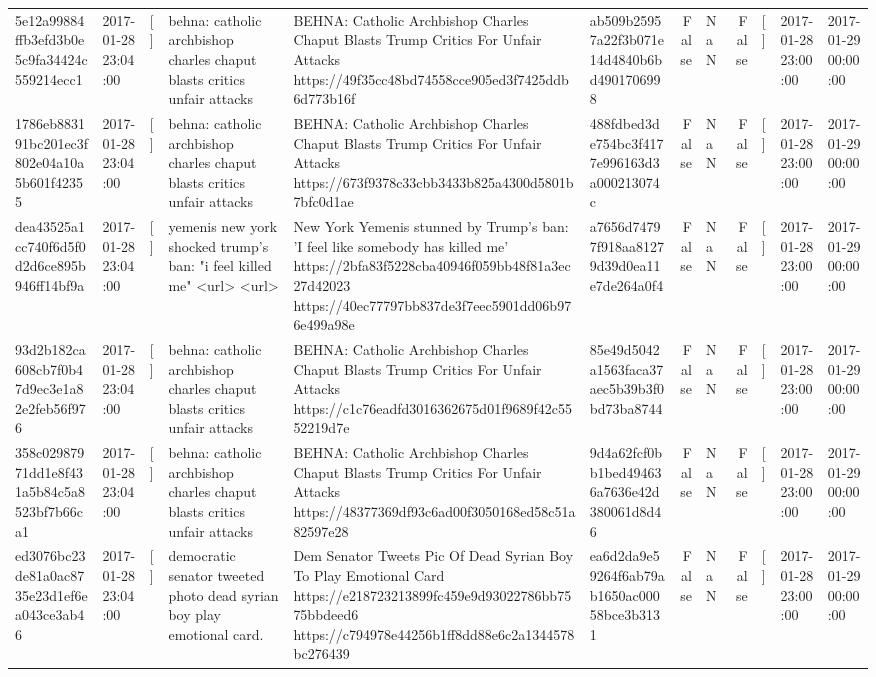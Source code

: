 \begin{tabular}{llllllrlrlll}
5e12a99884ffb3efd3b0e5c9fa34424c559214ecc1 & 2017-01-28 23:04:00 & [] & behna: catholic archbishop charles chaput blasts critics unfair attacks & BEHNA: Catholic Archbishop Charles Chaput Blasts Trump Critics For Unfair Attacks https://49f35cc48bd74558cce905ed3f7425ddb6d773b16f & ab509b25957a22f3b071e14d4840b6bd4901706998 & False & NaN & False & [] & 2017-01-28 23:00:00 & 2017-01-29 00:00:00 \\
1786eb883191bc201ec3f802e04a10a5b601f42355 & 2017-01-28 23:04:00 & [] & behna: catholic archbishop charles chaput blasts critics unfair attacks & BEHNA: Catholic Archbishop Charles Chaput Blasts Trump Critics For Unfair Attacks https://673f9378c33cbb3433b825a4300d5801b7bfc0d1ae & 488fdbed3de754bc3f4177e996163d3a000213074c & False & NaN & False & [] & 2017-01-28 23:00:00 & 2017-01-29 00:00:00 \\
dea43525a1cc740f6d5f0d2d6ce895b946ff14bf9a & 2017-01-28 23:04:00 & [] & yemenis new york shocked trump's ban: "i feel killed me" <url> <url> & New York Yemenis stunned by Trump's ban: 'I feel like somebody has killed me' https://2bfa83f5228cba40946f059bb48f81a3ec27d42023 https://40ec77797bb837de3f7eec5901dd06b976e499a98e & a7656d74797f918aa81279d39d0ea11e7de264a0f4 & False & NaN & False & [] & 2017-01-28 23:00:00 & 2017-01-29 00:00:00 \\
93d2b182ca608cb7f0b47d9ec3e1a82e2feb56f976 & 2017-01-28 23:04:00 & [] & behna: catholic archbishop charles chaput blasts critics unfair attacks & BEHNA: Catholic Archbishop Charles Chaput Blasts Trump Critics For Unfair Attacks https://c1c76eadfd3016362675d01f9689f42c5552219d7e & 85e49d5042a1563faca37aec5b39b3f0bd73ba8744 & False & NaN & False & [] & 2017-01-28 23:00:00 & 2017-01-29 00:00:00 \\
358c02987971dd1e8f431a5b84c5a8523bf7b66ca1 & 2017-01-28 23:04:00 & [] & behna: catholic archbishop charles chaput blasts critics unfair attacks & BEHNA: Catholic Archbishop Charles Chaput Blasts Trump Critics For Unfair Attacks https://48377369df93c6ad00f3050168ed58c51a82597e28 & 9d4a62fcf0bb1bed494636a7636e42d380061d8d46 & False & NaN & False & [] & 2017-01-28 23:00:00 & 2017-01-29 00:00:00 \\
ed3076bc23de81a0ac8735e23d1ef6ea043ce3ab46 & 2017-01-28 23:04:00 & [] & democratic senator tweeted photo dead syrian boy play emotional card. & Dem Senator Tweets Pic Of Dead Syrian Boy To Play Emotional Card https://e218723213899fc459e9d93022786bb7575bbdeed6 https://c794978e44256b1ff8dd88e6c2a1344578bc276439 & ea6d2da9e59264f6ab79ab1650ac00058bce3b3131 & False & NaN & False & [] & 2017-01-28 23:00:00 & 2017-01-29 00:00:00 \\

\end{tabular}

